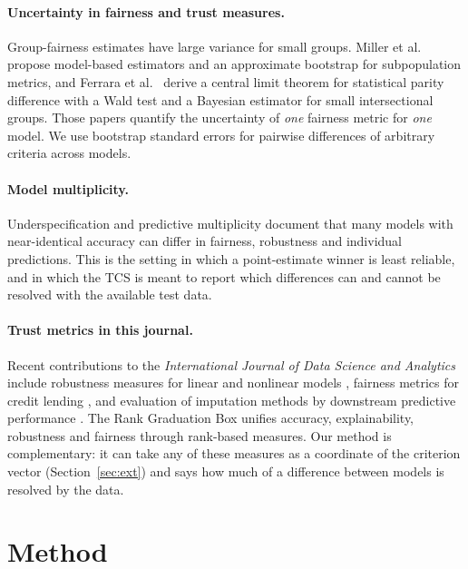 \documentclass[11pt,a4paper]{article}
\begin{document}
\paragraph{Uncertainty in fairness and trust measures.} Group-fairness estimates have large variance for small groups. Miller et al.\ \citeyearpar{miller2021} propose model-based estimators and an approximate bootstrap for subpopulation metrics, and Ferrara et al.\ \citeyearpar{ferrara2025} derive a central limit theorem for statistical parity difference with a Wald test and a Bayesian estimator for small intersectional groups. Those papers quantify the uncertainty of \emph{one} fairness metric for \emph{one} model. We use bootstrap standard errors for pairwise differences of arbitrary criteria across models.

\paragraph{Model multiplicity.} Underspecification \citep{damour2022} and predictive multiplicity \citep{marx2020} document that many models with near-identical accuracy can differ in fairness, robustness and individual predictions. This is the setting in which a point-estimate winner is least reliable, and in which the TCS is meant to report which differences can and cannot be resolved with the available test data.

\paragraph{Trust metrics in this journal.} Recent contributions to the \emph{International Journal of Data Science and Analytics} include robustness measures for linear and nonlinear models \citep{giudici2024robust}, fairness metrics for credit lending \citep{wu2026safe}, and evaluation of imputation methods by downstream predictive performance \citep{nikitina2026}. The Rank Graduation Box \citep{babaei2025rgb} unifies accuracy, explainability, robustness and fairness through rank-based measures. Our method is complementary: it can take any of these measures as a coordinate of the criterion vector (Section~\ref{sec:ext}) and says how much of a difference between models is resolved by the data.

\section{Method}
\end{document}
